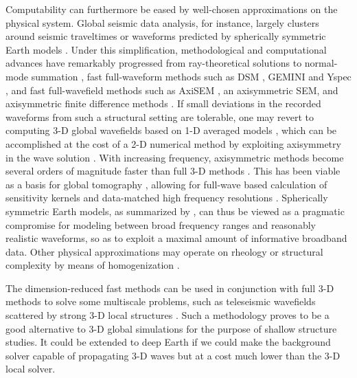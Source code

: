 \documentclass[extra]{gji}
\begin{document}
Computability can furthermore be eased by well-chosen approximations 
on the physical system. 
Global seismic data analysis, for instance, largely clusters around seismic traveltimes 
or waveforms predicted by spherically symmetric Earth models \cite[]{rawlinson2010seismic,
driel2015instaseis}.
Under this simplification, methodological and computational advances have remarkably progressed 
from ray-theoretical solutions \cite[]{jeffreys1958seismological} 
to normal-mode summation \cite[e.g., Chap 8,][]{dahlen1998theoretical},
fast full-waveform methods such as
DSM \cite[]{kawai2006complete}, GEMINI \cite[]{friederich1995complete} and 
Yspec \cite[]{al2008calculation}, 
and fast full-wavefield methods such as AxiSEM \cite[]{nissen2014axisem}, an axisymmetric SEM, and 
axisymmetric finite difference methods \cite[]{igel1995sh, toyokuni2006fdm}. 
If small deviations in the recorded waveforms from such a structural setting
are tolerable, one may revert to computing 3-D global wavefields based on
1-D averaged models \cite[e.g. PREM,][]{dziewonski1981prem}, 
which can be accomplished at the cost of a 2-D
numerical method by exploiting axisymmetry in the wave solution
\cite[]{nissen2007axisem}. 
With increasing frequency, axisymmetric methods become 
several orders of magnitude faster than full 3-D methods \cite[]{nissen2014axisem}. 
This has been viable as a basis for global tomography 
\cite[]{rawlinson2010seismic}, allowing for full-wave based calculation 
of sensitivity kernels \cite[]{colombi2012kernels} and data-matched 
high frequency resolutions \cite[e.g. 1Hz,][]{hosseini2015multifrequency}. 
Spherically symmetric Earth models, as summarized by \cite{nissen2014axisem},
can thus be viewed as a pragmatic compromise for modeling between broad
frequency ranges and reasonably realistic waveforms, so as to exploit 
a maximal amount of informative broadband data.
Other physical approximations may operate on rheology 
\cite[e.g., acoustic approximation, ][]{zhu2009elastic}
or structural complexity by means of homogenization \cite[]{capdeville2013residual}.

The dimension-reduced fast methods can be used in conjunction with
full 3-D methods to solve some multiscale problems, such as teleseismic 
wavefields scattered by strong 3-D local structures
\cite[e.g., ][]{masson2013numerical, monteiller2015three}. Such a methodology
proves to be a good alternative to 3-D global simulations for the purpose of shallow
structure studies. It could be extended to deep Earth if we 
could make the background solver capable of propagating 3-D waves 
but at a cost much lower than the 3-D local solver.
\end{document}
